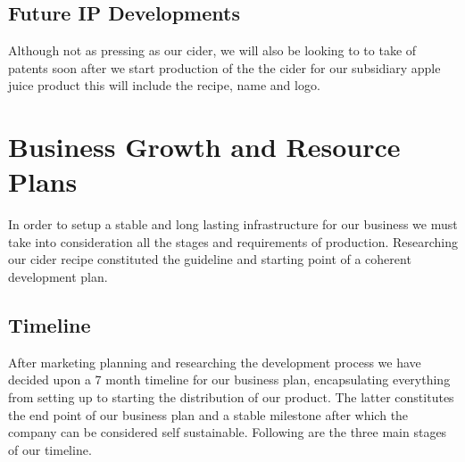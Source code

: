 \documentclass[11pt]{article}
\begin{document}
  \subsection{Future IP Developments}
Although not as pressing as our cider, we will also be looking to to take of 
patents soon after we start production of the the cider for our subsidiary apple 
juice product this will include the recipe, name and logo.

\newpage


\section{Business Growth and Resource Plans}
In order to setup a stable and long lasting infrastructure for our business we 
must take into consideration all the stages and requirements of production. 
Researching our cider recipe constituted the guideline and starting point of a 
coherent development plan.

  \subsection{Timeline}
After marketing planning and researching the development process we have decided
upon a 7 month timeline for our business plan, encapsulating everything from
setting up to starting the distribution of our product. The latter constitutes
the end point of our business plan and a stable milestone after which the
company can be considered self sustainable. Following are the three main stages
of our timeline.
\end{document}
